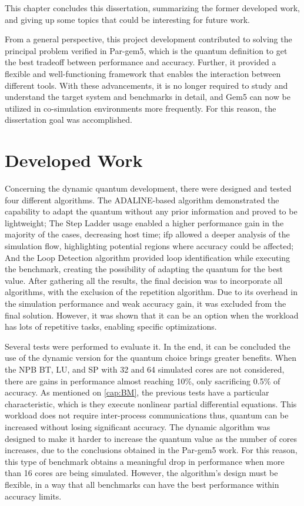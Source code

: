 

This chapter concludes this dissertation, summarizing the former developed work, and giving up some topics that could be
interesting for future work.

From a general perspective, this project development contributed to solving the principal problem verified in Par-gem5, which is the 
quantum definition to get the best tradeoff between performance and accuracy. Further, it provided a flexible and well-functioning framework 
that enables the interaction between different tools. With these advancements, it is no longer required to study and understand 
the target system and benchmarks in detail, and Gem5 can now be utilized in co-simulation environments more frequently.
For this reason, the dissertation goal was accomplished. 

\section{Developed Work}

Concerning the dynamic quantum development, there were designed and tested four different algorithms. 
The ADALINE-based algorithm demonstrated the capability to adapt the quantum without any prior information and proved to be lightweight;
The Step Ladder usage enabled a higher performance gain in the majority of the cases, decreasing host time; 
\gls{ifp} allowed a deeper analysis of the simulation flow, highlighting potential regions where accuracy could be affected; And the Loop Detection 
algorithm provided loop identification while executing the benchmark, creating the possibility of adapting the quantum 
for the best value. 
After gathering all the results, the final decision was to incorporate all algorithms, with the exclusion of the repetition algorithm.
Due to its overhead in the simulation performance and weak accuracy gain, it was excluded from the final solution. However, it was shown 
that it can be an option when the workload has lots of repetitive tasks, enabling specific optimizations.

Several tests were performed to evaluate it. In the end, it can be concluded the use of the dynamic version for the quantum choice brings 
greater benefits. When the NPB BT, LU, and SP with 32 and 64 simulated cores are not considered, there are gains in performance almost 
reaching 10\%, only sacrificing 0.5\% of accuracy. As mentioned on \autoref{cap:BM}, the previous tests have a particular characteristic, 
which is they execute nonlinear partial differential equations. This workload does not require inter-process communications thus, 
quantum can be increased without losing significant accuracy. The dynamic algorithm was designed to make it harder to increase the 
quantum value as the number of cores increases, due to the conclusions obtained in the Par-gem5 \cite*{pargem5} work. For this reason, 
this type of benchmark obtains a meaningful drop in performance when more than 16 cores are being simulated. However, the 
algorithm's design must be flexible, in a way that all benchmarks can have the best performance within accuracy limits.

